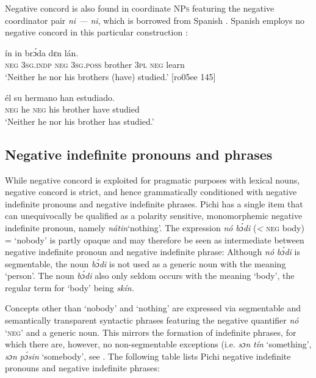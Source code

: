 Negative concord is also found in coordinate \textsc{NPs} featuring the negative coordinator pair \textit{ni — ni}, which is borrowed from Spanish . Spanish employs no negative concord in this particular construction : 


\ea%
    \label{ex:key:555}
    \gll {}  ín      in    brɔ́da  dɛn    lán.\\
\textsc{neg}  \textsc{3sg.indp}  \textsc{neg}  \textsc{3sg.poss}  brother  3\textsc{pl}  \textsc{neg}  learn\\

\glt ‘Neither he nor his brothers (have) studied.’ [ro05ee 145]
\z


\ea%
    \label{ex:key:556}
    \gll {}  él    su  hermano    han    estudiado.\\
\textsc{neg}  he  \textsc{neg}  his  brother    have  studied\\

\glt ‘Neither he nor his brother has studied.’
\z

\subsection{Negative indefinite pronouns and phrases}\label{sec:7.2.3}

While negative concord is exploited for pragmatic purposes with lexical nouns, negative concord is strict, and hence grammatically conditioned with negative indefinite pronouns and negative indefinite phrases. Pichi has a single item that can unequivocally be qualified as a polarity sensitive, monomorphemic negative indefinite pronoun, namely \textit{nátin}‘nothing’. The expression \textit{nó} \textit{bɔ́di} (\textit{<} \textsc{neg} body) = ‘nobody’ is partly opaque and may therefore be seen as intermediate between negative indefinite pronoun and negative indefinite phrase: Although \textit{nó} \textit{bɔ́di} is segmentable, the noun \textit{bɔ́di} is not used as a generic noun with the meaning ‘person’. The noun \textit{bɔ́di} also only seldom occurs with the meaning ‘body’, the regular term for ‘body’ being \textit{skín.} 


Concepts other than ‘nobody’ and ‘nothing’ are expressed via segmentable and semantically transparent syntactic phrases featuring the negative quantifier \textit{nó} ‘\textsc{neg’} and a generic noun. This mirrors the formation of indefinite phrases, for which there are, however, no non-segmentable exceptions (i.e. \textit{sɔn} \textit{tín} ‘something’, \textit{sɔn} \textit{pɔ́sin} ‘somebody’, see . The following table lists Pichi negative indefinite pronouns and negative indefinite phrases:


